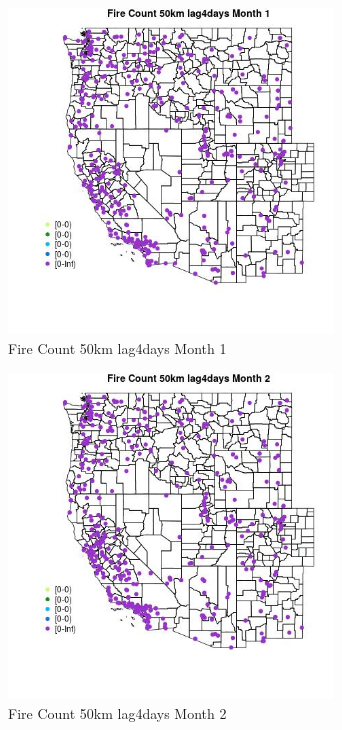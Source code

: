\begin{figure} 
\centering  
\includegraphics[width=0.77\textwidth]{Code_Outputs/Report_ML_input_PM25_Step4_part_e_de_duplicated_aves_compiled_2019-05-18wNAs_MapObsMo1Fire_Count_50km_lag4days.jpg} 
\caption{\label{fig:Report_ML_input_PM25_Step4_part_e_de_duplicated_aves_compiled_2019-05-18wNAsMapObsMo1Fire_Count_50km_lag4days}Fire Count 50km lag4days Month 1} 
\end{figure} 
 

\begin{figure} 
\centering  
\includegraphics[width=0.77\textwidth]{Code_Outputs/Report_ML_input_PM25_Step4_part_e_de_duplicated_aves_compiled_2019-05-18wNAs_MapObsMo2Fire_Count_50km_lag4days.jpg} 
\caption{\label{fig:Report_ML_input_PM25_Step4_part_e_de_duplicated_aves_compiled_2019-05-18wNAsMapObsMo2Fire_Count_50km_lag4days}Fire Count 50km lag4days Month 2} 
\end{figure} 
 

